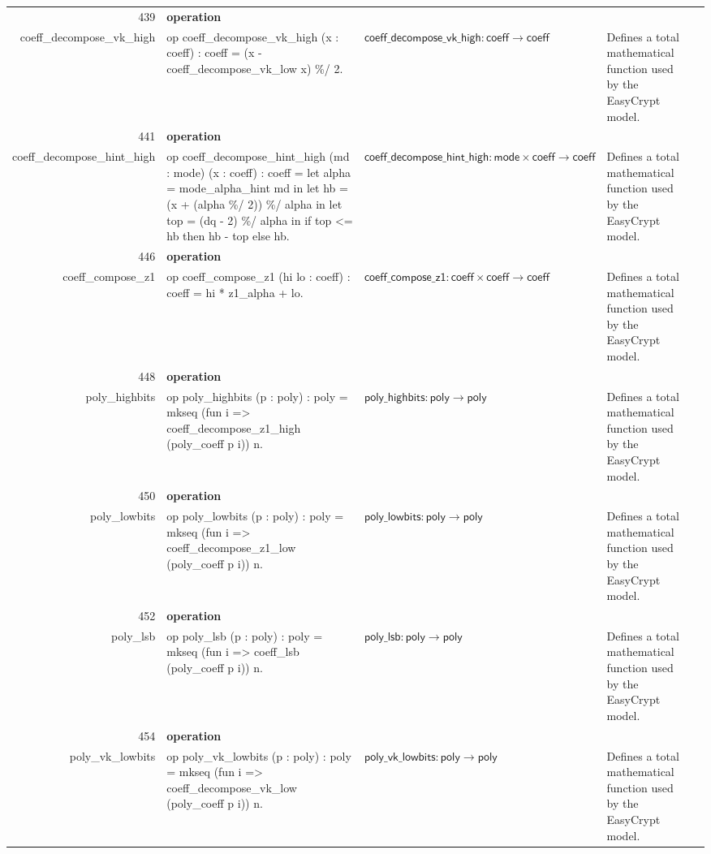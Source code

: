 \documentclass[10pt]{article}
\newcommand{\ec}[1]{\begingroup\ttfamily\scriptsize #1\endgroup}
\begin{document}
\begin{longtable}{r L{0.17\textwidth} L{0.26\textwidth} L{0.27\textwidth} L{0.20\textwidth}}
439 & \textbf{operation}\\\ec{coeff\_decompose\_vk\_high} & \ec{op coeff\_decompose\_vk\_high (x : coeff) : coeff = (x - coeff\_decompose\_vk\_low x) \%/ 2.} & \(\mathsf{coeff\_decompose\_vk\_high} : \mathsf{coeff} \to \mathsf{coeff}\) & Defines a total mathematical function used by the EasyCrypt model. \\
441 & \textbf{operation}\\\ec{coeff\_decompose\_hint\_high} & \ec{op coeff\_decompose\_hint\_high (md : mode) (x : coeff) : coeff = let alpha = mode\_alpha\_hint md in let hb = (x + (alpha \%/ 2)) \%/ alpha in let top = (dq - 2) \%/ alpha in if top <= hb then hb - top else hb.} & \(\mathsf{coeff\_decompose\_hint\_high} : \mathsf{mode} \times \mathsf{coeff} \to \mathsf{coeff}\) & Defines a total mathematical function used by the EasyCrypt model. \\
446 & \textbf{operation}\\\ec{coeff\_compose\_z1} & \ec{op coeff\_compose\_z1 (hi lo : coeff) : coeff = hi * z1\_alpha + lo.} & \(\mathsf{coeff\_compose\_z1} : \mathsf{coeff} \times \mathsf{coeff} \to \mathsf{coeff}\) & Defines a total mathematical function used by the EasyCrypt model. \\
448 & \textbf{operation}\\\ec{poly\_highbits} & \ec{op poly\_highbits (p : poly) : poly = mkseq (fun i => coeff\_decompose\_z1\_high (poly\_coeff p i)) n.} & \(\mathsf{poly\_highbits} : \mathsf{poly} \to \mathsf{poly}\) & Defines a total mathematical function used by the EasyCrypt model. \\
450 & \textbf{operation}\\\ec{poly\_lowbits} & \ec{op poly\_lowbits (p : poly) : poly = mkseq (fun i => coeff\_decompose\_z1\_low (poly\_coeff p i)) n.} & \(\mathsf{poly\_lowbits} : \mathsf{poly} \to \mathsf{poly}\) & Defines a total mathematical function used by the EasyCrypt model. \\
452 & \textbf{operation}\\\ec{poly\_lsb} & \ec{op poly\_lsb (p : poly) : poly = mkseq (fun i => coeff\_lsb (poly\_coeff p i)) n.} & \(\mathsf{poly\_lsb} : \mathsf{poly} \to \mathsf{poly}\) & Defines a total mathematical function used by the EasyCrypt model. \\
454 & \textbf{operation}\\\ec{poly\_vk\_lowbits} & \ec{op poly\_vk\_lowbits (p : poly) : poly = mkseq (fun i => coeff\_decompose\_vk\_low (poly\_coeff p i)) n.} & \(\mathsf{poly\_vk\_lowbits} : \mathsf{poly} \to \mathsf{poly}\) & Defines a total mathematical function used by the EasyCrypt model. \\

\end{longtable}
\end{document}
